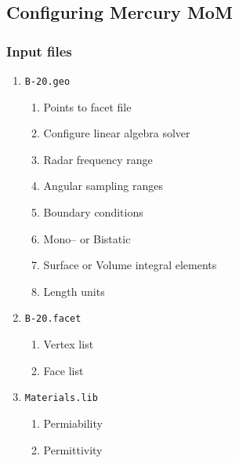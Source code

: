 \subsection{Configuring Mercury MoM}

\begin{frame}
	\frametitle{Input files}
	\begin{enumerate}
		\item \texttt{B-20.geo}
		\begin{enumerate}
			\item Points to facet file
			\item Configure linear algebra solver
			\item Radar frequency range
			\item Angular sampling ranges
			\item Boundary conditions
			\item Mono-- or Bistatic
			\item Surface or Volume integral elements
			\item Length units
		\end{enumerate}
		\item \texttt{B-20.facet}
		\begin{enumerate}
			\item Vertex list
			\item Face list 
		\end{enumerate}
		\item \texttt{Materials.lib}
		\begin{enumerate}
			\item Permiability
			\item Permittivity
		\end{enumerate}
	\end{enumerate}
\end{frame}

